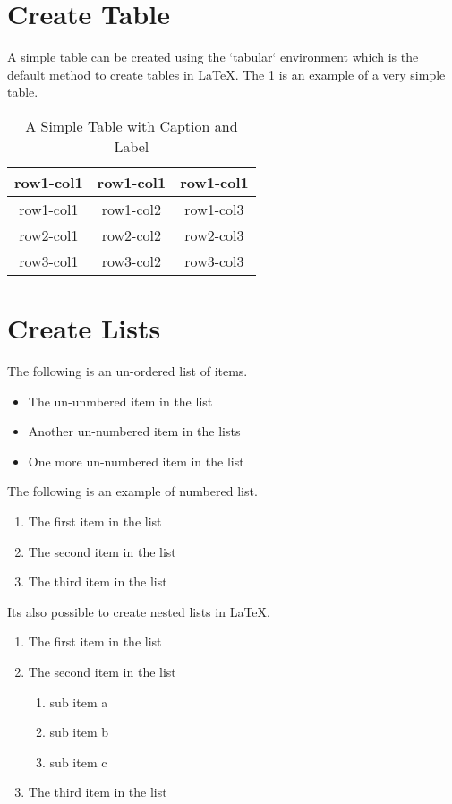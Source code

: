 \documentclass[12pt, letter]{article}
\begin{document}
\listoftables
\newpage

\section{Create Table}
A simple table can be created using the `tabular` environment which is the default method to create tables in LaTeX. The \ref{table1} is an example of  a very simple table.

\begin{table}[h!]
  \centering
  \caption{A Simple Table with Caption and Label}
  \label{table1}
  \begin{tabular}{ c c c }
    \hline
    row1-col1 & row1-col1 & row1-col1 \\
    \hline
    row1-col1 & row1-col2 & row1-col3 \\
    row2-col1 & row2-col2 & row2-col3 \\
    row3-col1 & row3-col2 & row3-col3 \\
    \hline
  \end{tabular}
\end{table}

\section{Create Lists}
The following is an un-ordered list of items.

\begin{itemize}
  \item The un-unmbered item in the list
  \item Another un-numbered item in the lists
  \item One more un-numbered item in the list
\end{itemize}

The following is an example of numbered list.

\begin{enumerate}
  \item The first item in the list
  \item The second item in the list
  \item The third item in the list
\end{enumerate}

Its also possible to create nested lists in \LaTeX.

\begin{enumerate}
  \item The first item in the list
  \item The second item in the list
        \begin{enumerate}
          \item sub item a
          \item sub item b
          \item sub item c
        \end{enumerate}
   \item The third item in the list
\end{enumerate}
\end{document}
